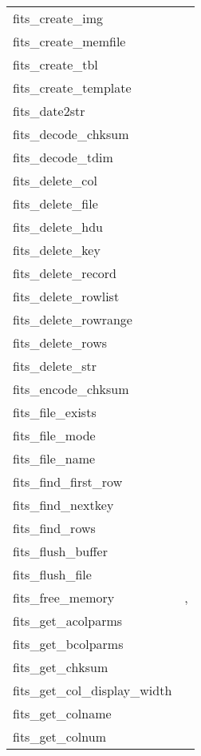 \documentclass[11pt]{book}
\begin{document}
\begin{tabular}{lr}
fits\_create\_img     & \pageref{ffcrim} \\
fits\_create\_memfile    & \pageref{ffimem} \\
fits\_create\_tbl     & \pageref{ffcrtb} \\
fits\_create\_template & \pageref{fftplt} \\
fits\_date2str  & \pageref{ffdt2s} \\
fits\_decode\_chksum  & \pageref{ffdsum} \\
fits\_decode\_tdim    & \pageref{ffdtdm} \\
fits\_delete\_col   & \pageref{ffdcol} \\
fits\_delete\_file    & \pageref{ffdelt} \\
fits\_delete\_hdu     & \pageref{ffdhdu} \\
fits\_delete\_key     & \pageref{ffdkey} \\
fits\_delete\_record  & \pageref{ffdrec} \\
fits\_delete\_rowlist & \pageref{ffdrws} \\
fits\_delete\_rowrange & \pageref{ffdrrg} \\
fits\_delete\_rows  & \pageref{ffdrow} \\
fits\_delete\_str  & \pageref{ffdkey} \\
fits\_encode\_chksum  & \pageref{ffesum} \\
fits\_file\_exists    & \pageref{ffexist} \\
fits\_file\_mode      & \pageref{ffflmd} \\
fits\_file\_name      & \pageref{ffflnm} \\
fits\_find\_first\_row    & \pageref{ffffrw} \\
fits\_find\_nextkey      & \pageref{ffgnxk} \\
fits\_find\_rows    & \pageref{fffrow} \\
fits\_flush\_buffer     & \pageref{ffflus} \\
fits\_flush\_file     & \pageref{ffflus} \\
fits\_free\_memory   & \pageref{ffgkls},  \pageref{ffhdr2str} \\
fits\_get\_acolparms  & \pageref{ffgacl} \\
fits\_get\_bcolparms  & \pageref{ffgbcl} \\
fits\_get\_chksum     & \pageref{ffgcks} \\
fits\_get\_col\_display\_width    & \pageref{ffgcdw} \\
fits\_get\_colname    & \pageref{ffgcnn} \\
fits\_get\_colnum     & \pageref{ffgcno} \\
\end{tabular}
\end{document}
